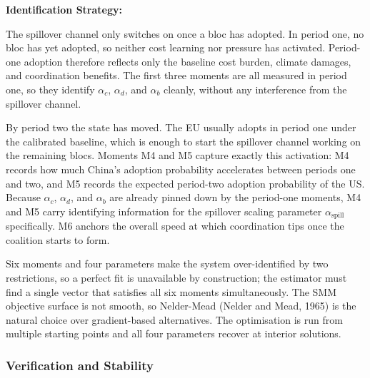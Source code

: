 \documentclass[10pt,a4paper]{article}
\newcommand{\bpar}[1]{%
  \par\addvspace{\medskipamount}%
  \needspace{4\baselineskip}%
  \noindent\textbf{#1}\par\nopagebreak[4]%
}
\begin{document}
\FloatBarrier

\FloatBarrier

\bpar{Identification Strategy:}

The spillover channel only switches on once a bloc has adopted. In period one, no bloc has yet adopted, so neither cost learning nor pressure has activated. Period-one adoption therefore reflects only the baseline cost burden, climate damages, and coordination benefits. The first three moments are all measured in period one, so they identify $\alpha_c$, $\alpha_d$, and $\alpha_b$ cleanly, without any interference from the spillover channel.

By period two the state has moved. The EU usually adopts in period one under the calibrated baseline, which is enough to start the spillover channel working on the remaining blocs. Moments M4 and M5 capture exactly this activation: M4 records how much China's adoption probability accelerates between periods one and two, and M5 records the expected period-two adoption probability of the US. Because $\alpha_c$, $\alpha_d$, and $\alpha_b$ are already pinned down by the period-one moments, M4 and M5 carry identifying information for the spillover scaling parameter $\alpha_{\text{spill}}$ specifically. M6 anchors the overall speed at which coordination tips once the coalition starts to form.

Six moments and four parameters make the system over-identified by two restrictions, so a perfect fit is unavailable by construction; the estimator must find a single vector that satisfies all six moments simultaneously. The SMM objective surface is not smooth, so Nelder-Mead (Nelder and Mead, 1965) is the natural choice over gradient-based alternatives. The optimisation is run from multiple starting points and all four parameters recover at interior solutions.


\FloatBarrier

\needspace{12em}
\subsubsection{Verification and Stability}
\end{document}
